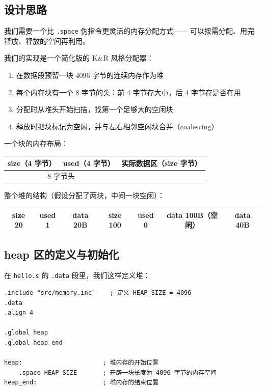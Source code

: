 \subsection{设计思路}

我们需要一个比 \texttt{.space} 伪指令更灵活的内存分配方式——
可以按需分配、用完释放、释放的空间再利用。

我们的实现是一个简化版的 K\&R 风格分配器：

\begin{enumerate}
    \item 在数据段预留一块 4096 字节的连续内存作为堆
    \item 每个内存块有一个 8 字节的头：前 4 字节存大小，后 4 字节存是否在用
    \item 分配时从堆头开始扫描，找第一个足够大的空闲块
    \item 释放时把块标记为空闲，并与左右相邻空闲块合并（coalescing）
\end{enumerate}

一个块的内存布局：

\begin{center}
\begin{tabular}{|c|c|c|}
\hline
size（4 字节） & used（4 字节） & 实际数据区（size 字节） \\
\hline
\multicolumn{2}{|c|}{8 字节头} & \\
\hline
\end{tabular}
\end{center}

整个堆的结构（假设分配了两块，中间一块空闲）：

\begin{center}
\begin{tabular}{|c|c|c|c|c|c|c|}
\hline
size 20 & used 1 & data 20B & size 100 & used 0 & data 100B（空闲） & data 40B \\
\hline
\end{tabular}
\end{center}

\subsection{heap 区的定义与初始化}

在 \texttt{hello.s} 的 \texttt{.data} 段里，我们这样定义堆：

\begin{lstlisting}[style=asm,caption=hello.s 中的 heap 定义]
.include "src/memory.inc"    ; 定义 HEAP_SIZE = 4096
.data
.align 4

.global heap
.global heap_end

heap:                      ; 堆内存的开始位置
    .space HEAP_SIZE       ; 开辟一块长度为 4096 字节的内存空间
heap_end:                  ; 堆内存的结束位置
\end{lstlisting}

